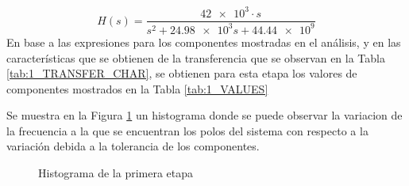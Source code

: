 \begin{equation}
    H(s) = \frac{\num{42e3}\cdot s}{s^2 + \num{24.98e3}s + \num{44.44e9}}
    \label{eq:1_TRANFER}
\end{equation}
En base a las expresiones para los componentes mostradas en el an\'alisis, y en las caracter\'isticas que se obtienen de la transferencia que se observan en la Tabla \ref{tab:1_TRANSFER_CHAR}, se obtienen para esta etapa los valores de componentes mostrados en la Tabla \ref{tab:1_VALUES}
\begin{table}[H]
    \centering
    \caption{Caracter\'isticas de la primera etapa}
    \label{tab:1_TRANSFER_CHAR}
\end{table}
\begin{table}[H]
    \centering
    \caption{Valores de componentes para la primera etapa}
    \label{tab:1_VALUES}
\end{table}
Se muestra en la Figura \ref{fig:1_HIST} un histograma donde se puede observar la variacion de la frecuencia a la que se encuentran los polos del sistema con respecto a la variaci\'on debida a la tolerancia de los componentes.
\begin{figure}[H]
    \centering
    \caption{Histograma de la primera etapa}
    \label{fig:1_HIST}
\end{figure}


